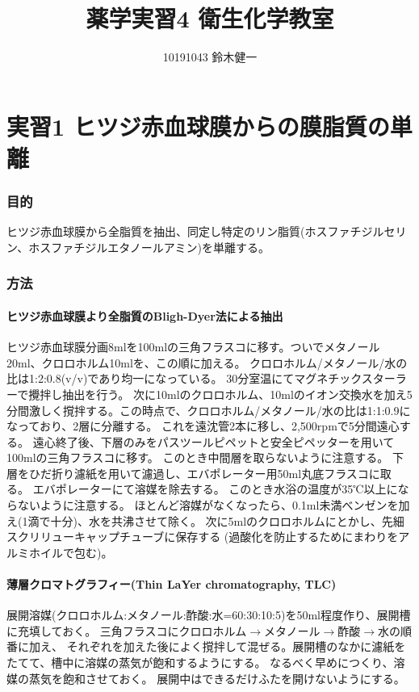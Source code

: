 \documentclass[a4paper,papersize,dvipdfmx]{jsarticle}
\begin{document}
\title{薬学実習4 衛生化学教室}
\author{10191043 鈴木健一}
\date{}
\maketitle



\part*{実習1 ヒツジ赤血球膜からの膜脂質の単離}

\section*{目的}
ヒツジ赤血球膜から全脂質を抽出、同定し特定のリン脂質(ホスファチジルセリン、ホスファチジルエタノールアミン)を単離する。

\section*{方法}

\subsection*{ヒツジ赤血球膜より全脂質のBligh-Dyer法による抽出}

ヒツジ赤血球膜分画8mlを100mlの三角フラスコに移す。ついでメタノール20ml、クロロホルム10mlを、この順に加える。
クロロホルム/メタノール/水の比は1:2:0.8(v/v)であり均一になっている。
30分室温にてマグネチックスターラーで攪拌し抽出を行う。
次に10mlのクロロホルム、10mlのイオン交換水を加え5分間激しく撹拌する。この時点で、クロロホルム/メタノール/水の比は1:1:0.9になっており、2層に分離する。
これを遠沈管2本に移し、2,500rpmで5分間遠心する。
遠心終了後、下層のみをパスツールピペットと安全ピペッターを用いて100mlの三角フラスコに移す。
このとき中間層を取らないように注意する。
下層をひだ折り濾紙を用いて濾過し、エバポレーター用50ml丸底フラスコに取る。
エバポレーターにて溶媒を除去する。
このとき水浴の温度が35℃以上にならないように注意する。
ほとんど溶媒がなくなったら、0.1ml未満べンゼンを加え(1滴で十分)、水を共沸させて除く。
次に5mlのクロロホルムにとかし、先細スクリリューキャップチューブに保存する
(過酸化を防止するためにまわりをアルミホイルで包む)。

\subsection*{薄層クロマトグラフィー(Thin LaYer chromatography, TLC)}
展開溶媒(クロロホルム:メタノール:酢酸:水=60:30:10:5)を50ml程度作り、展開槽に充填しておく。
三角フラスコにクロロホルム$\rightarrow$メタノール$\rightarrow$酢酸$\rightarrow$水の順番に加え、
それぞれを加えた後によく撹拌して混ぜる。展開槽のなかに濾紙をたてて、槽中に溶媒の蒸気が飽和するようにする。
なるべく早めにつくり、溶媒の蒸気を飽和させておく。
展開中はできるだけふたを開けないようにする。
\end{document}
